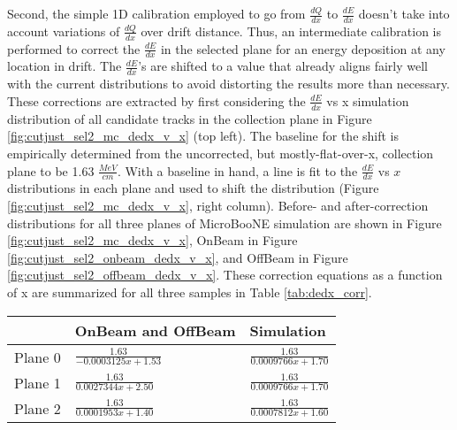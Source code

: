 \par Second, the simple 1D calibration employed to go from $\frac{dQ}{dx}$ to $\frac{dE}{dx}$ doesn't take into account variations of $\frac{dQ}{dx}$ over drift distance. Thus, an intermediate calibration is performed to correct the $\frac{dE}{dx}$ in the selected plane for an energy deposition at any location in drift. The $\frac{dE}{dx}$'s are shifted to a value that already aligns fairly well with the current distributions to avoid distorting the results more than necessary.  These corrections are extracted by first considering the $\frac{dE}{dx}$ vs x simulation distribution of all candidate tracks in the collection plane in Figure \ref{fig:cutjust_sel2_mc_dedx_v_x} (top left). The baseline for the shift is empirically determined from the uncorrected, but mostly-flat-over-x, collection plane to be 1.63 $\frac{MeV}{cm}$.  With a baseline in hand, a line is fit to the $\frac{dE}{dx}$ vs $x$ distributions in each plane and used to shift the distribution (Figure \ref{fig:cutjust_sel2_mc_dedx_v_x}, right column). Before- and after-correction distributions for all three planes of MicroBooNE simulation are shown in Figure \ref{fig:cutjust_sel2_mc_dedx_v_x}, OnBeam in Figure \ref{fig:cutjust_sel2_onbeam_dedx_v_x}, and OffBeam in Figure \ref{fig:cutjust_sel2_offbeam_dedx_v_x}.   These correction equations as a function of x are summarized for all three samples in Table \ref{tab:dedx_corr}. 

\begin{table} 
 \centering
 \begin{tabular}{| l | l | l |}
  \hline
  & OnBeam and OffBeam & Simulation\\ [0.1ex] \hline
Plane 0 & $\frac{1.63}{-0.0003125x + 1.53}$ & $\frac{1.63}{0.0009766x + 1.70}$ \\ \hline
Plane 1 & $\frac{1.63}{0.0027344x + 2.50}$ & $\frac{1.63}{0.0009766x + 1.70}$ \\ \hline 
Plane 2 & $\frac{1.63}{0.0001953x + 1.40}$ & $\frac{1.63}{0.0007812x + 1.60}$ \\  \hline
\end{tabular}
\end{table}




